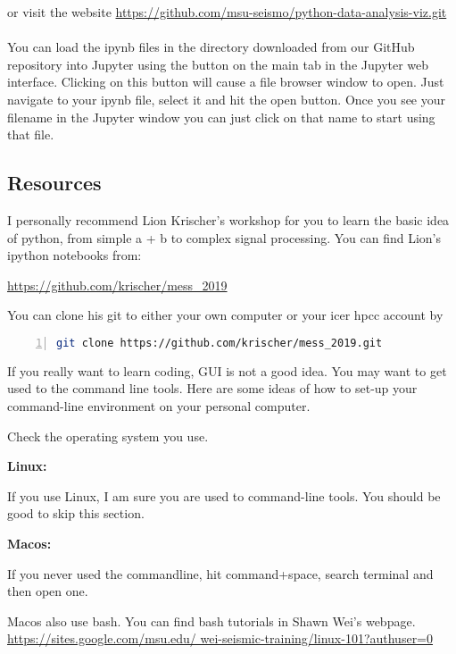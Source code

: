 \documentclass[12pt]{article}   	%
\begin{document}
or visit the website  \href{https://github.com/msu-seismo/python-data-analysis-viz.git}{https://github.com/msu-seismo/python-data-analysis-viz.git} \\\\
You can load the ipynb files in the directory downloaded from our GitHub repository into Jupyter using the
 button on the main  tab in the Jupyter web interface. Clicking on this button will
cause a file browser window to open. Just navigate to your ipynb file, select it and hit the
open button. Once you see your filename in the Jupyter window you can just click on that
name to start using that file. 

\subsection*{Resources}
I personally recommend Lion Krischer's workshop for you to learn the basic idea of python, from simple a + b to complex signal processing. You can find Lion's ipython notebooks from:

\href{https://github.com/krischer/mess_2019}{https://github.com/krischer/mess\_2019}

You can clone his git to either your own computer or your icer hpcc account by
\begin{lstlisting}[language=bash, numbers=left, numberstyle=\tiny,keywordstyle=\color{blue!70},basicstyle=\ttfamily]
git clone https://github.com/krischer/mess_2019.git
\end{lstlisting}

If you really want to learn coding, GUI is not a good idea. You may want to get used to the command line tools. Here are some ideas of how to set-up your command-line environment on your personal computer.

Check the operating system you use. 

\textbf{Linux:} 

If you use Linux, I am sure you are used to command-line tools. You should be good to skip this section.

\textbf{Macos:} 

If you never used the commandline, hit command+space, search terminal and then open one.

Macos also use bash. You can find bash tutorials in Shawn Wei's webpage.
\href{https://sites.google.com/msu.edu/wei-seismic-training/linux-101?authuser=0}{https://sites.google.com/msu.edu/ wei-seismic-training/linux-101?authuser=0}
\end{document}
